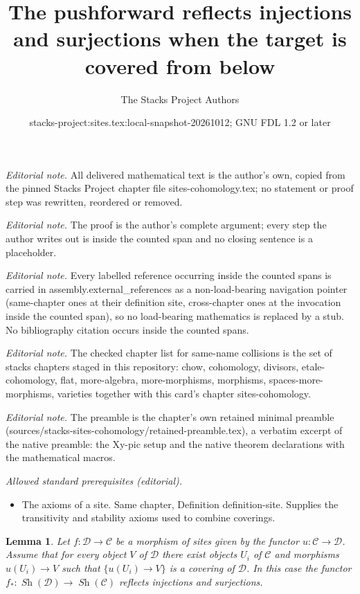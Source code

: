 \documentclass[10pt,a4paper]{amsart}
\title{The pushforward reflects injections and surjections when the target is covered from below}
\author{The Stacks Project Authors}
\date{stacks-project:sites.tex:local-snapshot-20261012; GNU FDL 1.2 or later}
\theoremstyle{plain}
\newtheorem{lemma}[subsection]{Lemma}
\theoremstyle{definition}
\theoremstyle{remark}
\numberwithin{equation}{subsection}
\def\Sh{\mathop{\mathit{Sh}}\nolimits}
\begin{document}
\maketitle
\noindent\textit{Editorial note.} All delivered mathematical text is the author's own, copied from the pinned Stacks Project chapter file sites-cohomology.tex; no statement or proof step was rewritten, reordered or removed.\par\medskip
\noindent\textit{Editorial note.} The proof is the author's complete argument; every step the author writes out is inside the counted span and no closing sentence is a placeholder.\par\medskip
\noindent\textit{Editorial note.} Every labelled reference occurring inside the counted spans is carried in assembly.external\_references as a non-load-bearing navigation pointer (same-chapter ones at their definition site, cross-chapter ones at the invocation inside the counted span), so no load-bearing mathematics is replaced by a stub. No bibliography citation occurs inside the counted spans.\par\medskip
\noindent\textit{Editorial note.} The checked chapter list for same-name collisions is the set of stacks chapters staged in this repository: chow, cohomology, divisors, etale-cohomology, flat, more-algebra, more-morphisms, morphisms, spaces-more-morphisms, varieties together with this card's chapter sites-cohomology.\par\medskip
\noindent\textit{Editorial note.} The preamble is the chapter's own retained minimal preamble (sources/stacks-sites-cohomology/retained-preamble.tex), a verbatim excerpt of the native preamble: the Xy-pic setup and the native theorem declarations with the mathematical macros.\par\medskip
\noindent\textit{Allowed standard prerequisites (editorial).}\begin{itemize}
\item The axioms of a site. Same chapter, Definition definition-site. Supplies the transitivity and stability axioms used to combine coverings.
\end{itemize}\medskip
\begin{lemma}
\label{lemma-cover-from-below}
Let $f : \mathcal{D} \to \mathcal{C}$ be a morphism of sites given
by the functor $u : \mathcal{C} \to \mathcal{D}$.
Assume that for every object $V$ of $\mathcal{D}$ there exist objects
$U_i$ of $\mathcal{C}$ and morphisms $u(U_i) \to V$ such that
$\{u(U_i) \to V\}$ is a covering of $\mathcal{D}$. In this case the functor
$f_* : \Sh(\mathcal{D}) \to \Sh(\mathcal{C})$ reflects
injections and surjections.
\end{lemma}
\end{document}
